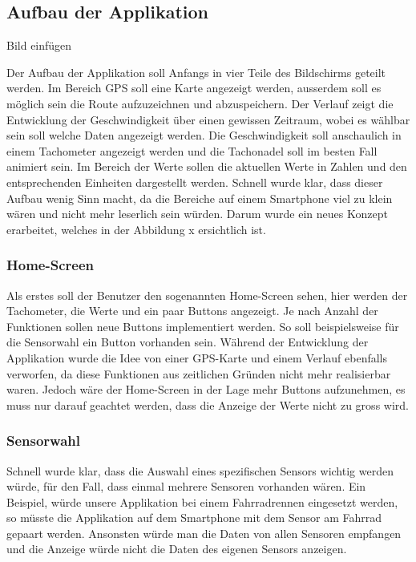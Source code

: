 \subsection{Aufbau der Applikation}

Bild einfügen


Der Aufbau der Applikation soll Anfangs in vier Teile des Bildschirms geteilt werden. 
Im Bereich GPS soll eine Karte angezeigt werden, ausserdem soll es möglich sein die Route aufzuzeichnen und abzuspeichern.
Der Verlauf zeigt die Entwicklung der Geschwindigkeit über einen gewissen Zeitraum, wobei es wählbar sein soll welche Daten angezeigt werden.
Die Geschwindigkeit soll anschaulich in einem Tachometer angezeigt werden und die Tachonadel soll im besten Fall animiert sein.
Im Bereich der Werte sollen die aktuellen Werte in Zahlen und den entsprechenden Einheiten dargestellt werden.
Schnell wurde klar, dass dieser Aufbau wenig Sinn macht, da die Bereiche auf einem Smartphone viel zu klein wären und nicht mehr leserlich sein würden. Darum wurde ein neues Konzept erarbeitet, welches in der Abbildung x ersichtlich ist.

\subsubsection{Home-Screen}

Als erstes soll der Benutzer den sogenannten Home-Screen sehen, hier werden der Tachometer, die Werte und ein paar Buttons angezeigt. Je nach Anzahl der Funktionen sollen neue Buttons implementiert werden. So soll beispielsweise für die Sensorwahl ein Button vorhanden sein. Während der Entwicklung der Applikation wurde die Idee von einer GPS-Karte und einem Verlauf ebenfalls verworfen, da diese Funktionen aus zeitlichen Gründen nicht mehr realisierbar waren. Jedoch wäre der Home-Screen in der Lage mehr Buttons aufzunehmen, es muss nur darauf geachtet werden, dass die Anzeige der Werte nicht zu gross wird.

\subsubsection{Sensorwahl}

Schnell wurde klar, dass die Auswahl eines spezifischen Sensors wichtig werden würde, für den Fall, dass einmal mehrere Sensoren vorhanden wären. Ein Beispiel, würde unsere Applikation bei einem Fahrradrennen eingesetzt werden, so müsste die Applikation auf dem Smartphone mit dem Sensor am Fahrrad gepaart werden. Ansonsten würde man die Daten von allen Sensoren empfangen und die Anzeige würde nicht die Daten des eigenen Sensors anzeigen.

